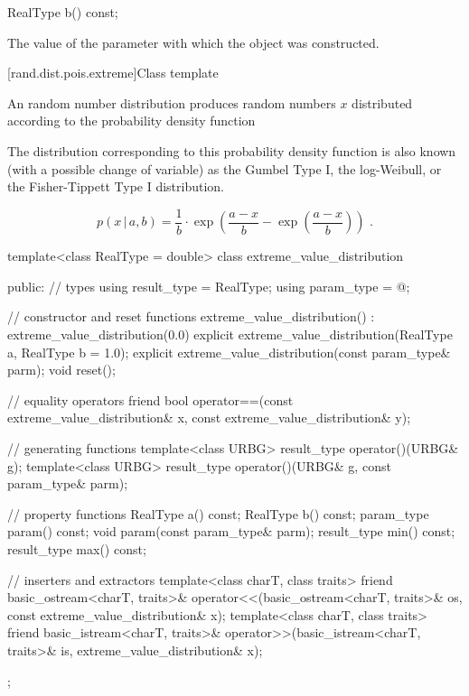 %
\begin{itemdecl}
RealType b() const;
\end{itemdecl}

\begin{itemdescr}
\pnum
\returns
The value of the  parameter
 with which the object was constructed.
\end{itemdescr}


[rand.dist.pois.extreme]{Class template }
%

\pnum
An  random number distribution
produces random numbers $x$
distributed according to
the probability density function
\begin{footnote}
The distribution corresponding to
 this probability density function
 is also known
 (with a possible change of variable)
 as the Gumbel Type I,
 the log-Weibull,
 or the Fisher-Tippett Type I
 distribution.
\end{footnote}
\[ p(x\,|\,a,b) = \frac{1}{b}
     \cdot \exp\left(\frac{a-x}{b} - \exp\left(\frac{a-x}{b}\right)\right)
     \text{ .} \]

%
%
\begin{codeblock}
template<class RealType = double>
  class extreme_value_distribution {
  public:
    // types
    using result_type = RealType;
    using param_type  = @\unspec@;

    // constructor and reset functions
    extreme_value_distribution() : extreme_value_distribution(0.0) {}
    explicit extreme_value_distribution(RealType a, RealType b = 1.0);
    explicit extreme_value_distribution(const param_type& parm);
    void reset();

    // equality operators
    friend bool operator==(const extreme_value_distribution& x,
                           const extreme_value_distribution& y);

    // generating functions
    template<class URBG>
      result_type operator()(URBG& g);
    template<class URBG>
      result_type operator()(URBG& g, const param_type& parm);

    // property functions
    RealType a() const;
    RealType b() const;
    param_type param() const;
    void param(const param_type& parm);
    result_type min() const;
    result_type max() const;

    // inserters and extractors
    template<class charT, class traits>
      friend basic_ostream<charT, traits>&
        operator<<(basic_ostream<charT, traits>& os, const extreme_value_distribution& x);
    template<class charT, class traits>
      friend basic_istream<charT, traits>&
        operator>>(basic_istream<charT, traits>& is, extreme_value_distribution& x);
  };
\end{codeblock}

